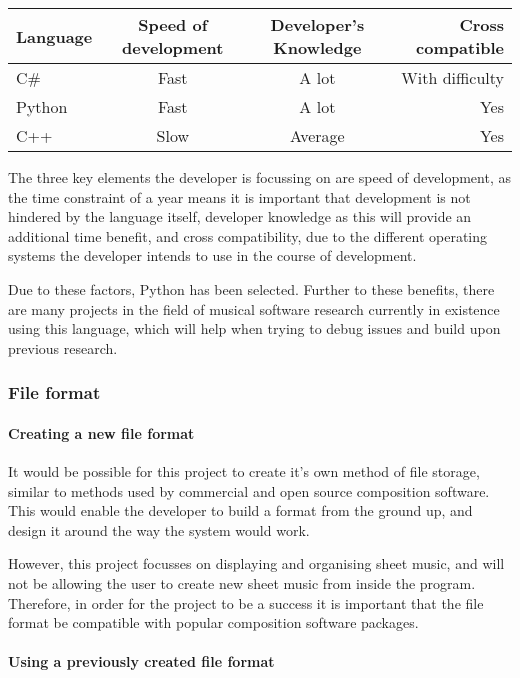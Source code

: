 \begin{center}
\begin{tabular}{| l | c | c | r |} \hline
  {Language} & {Speed of development} & {Developer's Knowledge} & {Cross compatible} \\ \hline
  C\# & Fast & A lot & With difficulty \\ \hline
  Python & Fast & A lot & Yes \\ \hline
  C++ & Slow & Average & Yes \\ \hline
\end{tabular}
\end{center}
The three key elements the developer is focussing on are speed of development, as the time constraint of a year means it is important that development is not hindered by the language itself, developer knowledge as this will provide an additional time benefit, and cross compatibility, due to the different operating systems the developer intends to use in the course of development.

Due to these factors, Python has been selected. Further to these benefits, there are many projects in the field of musical software research currently in existence using this language, \parencite{pmus} which will help when trying to debug issues and build upon previous research.

\subsubsection{File format}
\paragraph{Creating a new file format}

It would be possible for this project to create it's own method of file storage, similar to methods used by commercial and open source composition software. This would enable the developer to build a format from the ground up, and design it around the way the system would work.

However, this project focusses on displaying and organising sheet music, and will not be allowing the user to create new sheet music from inside the program. Therefore, in order for the project to be a success it is important that the file format be compatible with popular composition software packages.

\paragraph{Using a previously created file format}

